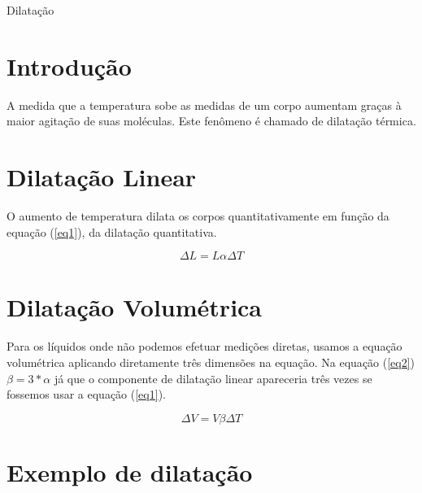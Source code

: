 \documentclass[a4paper,12pt]{article}
\begin{document}
\begin{center}
\Huge{Dilata{\c c}{\~ a}o}
\end{center}

\section{Introdu{\c c}{\~ a}o}

A medida que a temperatura sobe as medidas de um corpo aumentam gra{\c c}as {\`
a} maior agita{\c c}{\~ a}o de suas mol{\' e}culas. Este fen{\^ o}meno {\' e}
chamado de dilata{\c c}{\~ a}o t{\' e}rmica.

\section{Dilata{\c c}{\~ a}o Linear}

O aumento de temperatura dilata os corpos quantitativamente em fun{\c c}{\~ a}o
da equa{\c c}{\~ a}o (\ref{eq1}), da dilata{\c c}{\~ a}o quantitativa.

\begin{equation}
\Delta L=L\alpha\Delta T
\label{eq1}
\end{equation}

\section{Dilata{\c c}{\~ a}o Volum{\' e}trica}

Para os l{\' i}quidos onde n{\~ a}o podemos efetuar medi{\c c}{\~ o}es diretas,
usamos a equa{\c c}{\~ a}o volum{\' e}trica aplicando diretamente tr{\^ e}s
dimens{\~ o}es na equa{\c c}{\~ a}o.  Na equa{\c c}{\~ a}o (\ref{eq2})
$\beta = 3*\alpha$ j{\' a} que o componente de dilata{\c c}{\~ a}o linear
apareceria tr{\^ e}s vezes se fossemos usar a equa{\c c}{\~ a}o (\ref{eq1}).

\begin{equation}
\Delta V=V\beta\Delta T
\label{eq2}
\end{equation}

\section{Exemplo de dilata{\c c}{\~ a}o}
\end{document}
